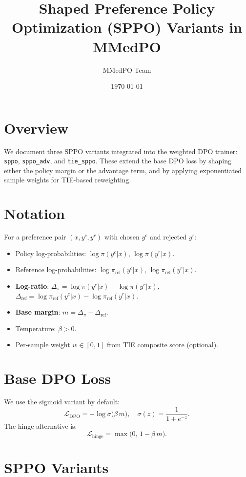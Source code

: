 \documentclass[11pt]{article}
\title{Shaped Preference Policy Optimization (SPPO) Variants in MMedPO}
\author{MMedPO Team}
\date{\today}
\begin{document}
\maketitle

\section*{Overview}
We document three SPPO variants integrated into the weighted DPO trainer: \texttt{sppo}, \texttt{sppo\_adv}, and \texttt{tie\_sppo}. These extend the base DPO loss by shaping either the policy margin or the advantage term, and by applying exponentiated sample weights for TIE-based reweighting.

\section*{Notation}
For a preference pair $(x, y^{c}, y^{r})$ with chosen $y^{c}$ and rejected $y^{r}$:
\begin{itemize}
  \item Policy log-probabilities: $\log\pi(y^{c}|x)$, $\log\pi(y^{r}|x)$.
  \item Reference log-probabilities: $\log\pi_{\text{ref}}(y^{c}|x)$, $\log\pi_{\text{ref}}(y^{r}|x)$.
  \item \textbf{Log-ratio}: $\Delta_{\pi} = \log\pi(y^{c}|x) - \log\pi(y^{r}|x)$, \quad $\Delta_{\text{ref}} = \log\pi_{\text{ref}}(y^{c}|x) - \log\pi_{\text{ref}}(y^{r}|x)$.
  \item \textbf{Base margin}: $m = \Delta_{\pi} - \Delta_{\text{ref}}$.
  \item Temperature: $\beta>0$.
  \item Per-sample weight $w \in [0, 1]$ from TIE composite score (optional).
\end{itemize}

\section*{Base DPO Loss}
We use the sigmoid variant by default:
\begin{equation}
\mathcal{L}_{\text{DPO}} = -\log\sigma\big(\beta\, m\big), \quad \sigma(z) = \frac{1}{1+e^{-z}}.
\end{equation}
The hinge alternative is:
\begin{equation}
\mathcal{L}_{\text{hinge}} = \max\big(0,\, 1 - \beta\, m\big).
\end{equation}

\section*{SPPO Variants}
\end{document}

